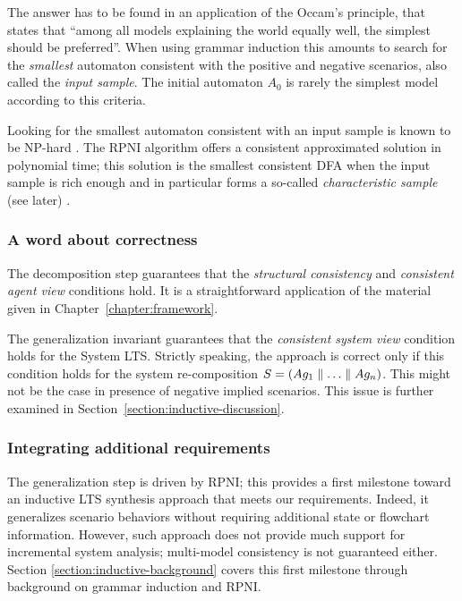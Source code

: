 The answer has to be found in an application of the Occam's principle, that states that ``among all models explaining the world equally well, the simplest should be preferred''. When using grammar induction this amounts to search for the \emph{smallest} automaton consistent with the positive and negative scenarios, also called the \emph{input sample}. The initial automaton $A_0$ is rarely the simplest model according to this criteria. 

Looking for the smallest automaton consistent with an input sample is known to be NP-hard \cite{Gold:1978, Angluin:1978}. The RPNI algorithm offers a consistent approximated solution in polynomial time; this solution is the smallest consistent DFA when the input sample is rich enough and in particular forms a so-called \emph{characteristic sample} (see later) \cite{Oncina:1992}.

\subsubsection*{A word about correctness}

The decomposition step guarantees that the \emph{structural consistency} and \emph{consistent agent view} conditions hold. It is a straightforward application of the material given in Chapter~\ref{chapter:framework}. 

The generalization invariant guarantees that the \emph{consistent system view} condition holds for the System LTS. Strictly speaking, the approach is correct only if this condition holds for the system re-composition $S = (Ag_1 \parallel \ldots \parallel Ag_n)$. This might not be the case in presence of negative implied scenarios. This issue is further examined in Section~\ref{section:inductive-discussion}.

\subsubsection*{Integrating additional requirements}

The generalization step is driven by RPNI; this provides a first milestone toward an inductive LTS synthesis approach that meets our requirements. Indeed, it generalizes scenario behaviors without requiring additional state or flowchart information. However, such approach does not provide much support for incremental system analysis; multi-model consistency is not guaranteed either. Section \ref{section:inductive-background} covers this first milestone through background on grammar induction and RPNI.

